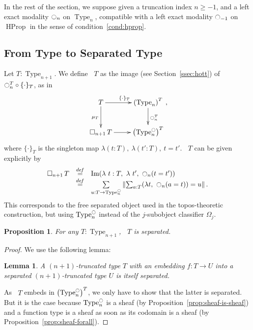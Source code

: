 \documentclass[preprint,9pt,numbers]{sigplanconf}
\newtheorem{prop}[thm]{Proposition}
\newtheorem{lem}[thm]{Lemma}
\newcommand \defeq {\overset{de\hspace{-0.2ex}f}{=}}
\DeclareMathOperator{\Type}{Type}
\DeclareMathOperator{\HProp}{HProp}
\DeclareMathOperator{\im}{Im}
\newcommand{\modal}{\ensuremath{\ocircle}}
\newcommand \separated {\mathop{\square_{n+1}} }
\newenvironment{mymath}[1][-0em]{%
  \newcommand\mymathaux{\vspace{#1}}%
  \vspace{#1}%
  \begin{equation*}%
  }{ %
    \mymathaux%
  \end{equation*}}
\begin{document}

In the rest of the section, we suppose given a truncation index
$n\geqslant -1$, and a left exact modality $\modal_n$ on $\Type_n$,
compatible with a left exact modality $\modal_{-1}$ on $\HProp$ in the
sense of condition~\ref{cond:hprop}.

\subsection{From Type to Separated Type}
\label{ssec:from-type-separated}

Let $T : \Type_{n+1}$. We define $\separated T$ as the image (see
Section~\ref{ssec:hott}) of
$\modal_n^T \circ \{\cdot\}_T$, as in
\begin{mymath}\xymatrix{
    T \ar[r]^{\{\cdot\}_T} \ar[d]_{\mu_T} & \left(\Type_n\right)^T \ar[d]^{\modal_n^T} \\
  \separated T \ar[r]& \left( \Type_n^\modal \right)^T
}, \end{mymath}%
where $\{\cdot\}_T$ is the singleton map $\lambda (t:T),~\lambda
(t':T),~t=t'$. 
%
$\separated T$ can be given explicitly by
%
\begin{mymath}
\begin{array}{rcl}
\separated T &\defeq & \im (\lambda~t:T,~\lambda~ t',~ \modal_n (t = t')) \\
          & \defeq & \sum\limits_{u:T \to \Type_n^\modal} \left\| \sum_{a:T} 
            (\lambda t,~\modal_n (a=t)) = u\right\|.
\end{array}
\end{mymath}%
%
This corresponds to the free separated object used in the topos-theoretic construction, but using $\Type_n^\modal$ instead of the
$j$-subobject classifier $\Omega_j$.
%
\begin{prop}
  For any $T\!:\!\Type_{n+1}$, $\separated T$ is separated.  
\end{prop}

\begin{proof}
We use the following lemma:
\begin{lem}
  A $(n+1)$-truncated type $T$ with an embedding $f : T \to U$
  into a separated $(n+1)$-truncated type $U$ is itself separated.
\end{lem}
As $\separated T$ embeds in $\left( \Type_n^\modal \right)^T$, we only
have to show that the latter is separated. But it is the case because
$\Type_n^\modal$ is a sheaf (by Proposition~\ref{prop:sheaf-is-sheaf})
and a function type is a sheaf as soon
as its codomain is a sheaf (by Proposition~\ref{prop:sheaf-forall}).
\end{proof}
\end{document}
